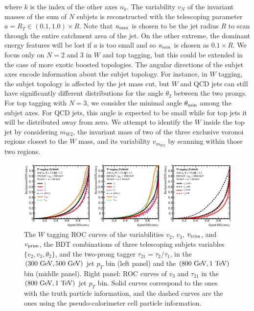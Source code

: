 \documentclass[aps,prl,floatfix,preprintnumbers,twocolumn,groupedaddress,nofootinbib]{revtex4-1}
\begin{document}
where $k$ is the index of the other axes $\hat n_k$. The variability $v_N$ of the invariant masses of the sum of $N$ subjets is reconstructed with the telescoping parameter $a = R_{T}\in (0.1, 1.0)\times R$. Note that $a_{\rm max}$ is chosen to be the jet radius $R$ to scan through the entire catchment area of the jet. On the other extreme, the dominant energy features will be lost if $a$ is too small and so $a_{\rm min}$ is chosen as $0.1\times R$. We focus only on $N = $2 and 3 in $W$ and top tagging, but this could be extended in the case of more exotic boosted topologies. %
The angular directions of the subjet axes encode information about the subjet topology. For instance, in $W$ tagging, the subjet topology is affected by the jet mass cut, but $W$ and QCD jets can still have significantly different distributions for the angle $\theta_2$ between the two prongs. For top tagging with $N=3$, we consider the minimal angle $\theta_{\rm min}$ among the subjet axes. For QCD jets, this angle is expected to be small while for top jets it will be distributed away from zero. We attempt to identify the $W$ inside the top jet \cite{Thaler:2008ju,Kaplan:2008ie} by considering $m_{W2}$, the invariant mass of two of the three exclusive voronoi regions closest to the $W$ mass, and its variability $v_{m_{W2}}$ by scanning within those two regions.

\begin{figure}
    \includegraphics[width=2\columnwidth]{plots/W_ROCs_5.eps}
    \caption{The $W$ tagging ROC curves of the variabilities $v_2$, $v_3$, $v_{\rm trim}$, and $v_{\rm prun}$,
    the BDT combinations of three telescoping subjets variables $\{v_2, v_3, \theta_2\}$, and the two-prong tagger $\tau_{21}=\tau_{2}/\tau_{1}$, in the $(300~{\rm GeV}, 500~{\rm GeV})$ jet $p_T$ bin (left panel) and the $(800~{\rm GeV}, 1~{\rm TeV})$ bin (middle panel). Right panel: ROC curves of $v_3$ and $\tau_{21}$ in the $(800~{\rm GeV}, 1~{\rm TeV})$ jet $p_T$ bin. Solid curves correspond to the ones with the truth particle information, and the dashed curves are the ones using the pseudo-calorimeter cell particle information.}
\label{ROC_W}
\end{figure}
\end{document}
